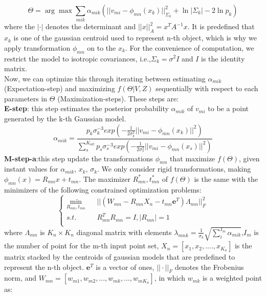 \begin{equation}
\label{equ:obj3}
\Theta=\arg\max\sum_{mik}\alpha_{mik}(||v_{mi}-\phi_{mn}(x_k)||_{\Sigma_k}^2 + \ln |\Sigma_k| - 2\ln p_k)
\end{equation}
where the $|\cdot|$ denotes the determinant and $||x||_A^2=x^TA^{-1}x$. It is predefined that $x_k$ is one of the gaussian centroid used to represent n-th object, which is why we apply transformation $\phi_{mn}$ on to the $x_k$. For the convenience of computation, we restrict the model to isotropic covariances, i.e.,$\Sigma_k=\sigma^2I$ and $I$ is the identity matrix.\\
Now, we can optimize this through iterating between estimating $\alpha_{mik}$ (Expectation-step) and maximizing $f(\Theta|V,Z)$ sequentially with respect to each parameters in $\Theta$ (Maximization-steps).
These steps are:\\
\textbf{E-step}:
this step estimates the posterior probability $\alpha_{mik}$ of $v_{mi}$ to be a point generated by the k-th Gaussian model.\\
\begin{equation}
\label{equ:estep}
\alpha_{mik}=\frac{p_k\sigma_k^{-3}exp(-\frac{1}{2\sigma_k^2}||v_{mi}-\phi_{mn}(x_k)||^2)}{\sum_s^{K_{all}}p_s\sigma_s^{-3}exp(-\frac{1}{2\sigma_s^2}||v_{mi}-\phi_{mn}(x_s)||^2)}
\end{equation}
\textbf{M-step-a}:this step update the transformations $\phi_{mn}$ that maximize $f(\Theta)$, given instant values for $\alpha_{mik}$, $x_k$, $\sigma_k$. We only consider rigid transformations, making  $\phi_{mn}(x)=R_{mn}x+t_{mn}$. The maximizer $R_{mn}^*,t_{mn}^*$  of $f(\Theta)$ is the same with the minimizers of the following constrained optimization problems:\\
\begin{equation}
\left\{
\begin{array}{rcl}
\min_{R_{mn},t_{mn}}&      &||(W_{mn}-R_{mn}X_n-t_{mn}\mathbf{e}^T)\Lambda_{mn}||_F^2\\
s.t.&      &R_{mn}^TR_{mn}=I, |R_{mn}|=1\\
\end{array} \right.
\end{equation}
where $\Lambda_{mn}$ is $K_n \times K_n$ diagonal matrix with elements $\lambda_{mnk}=\frac{1}{\sigma_k}\sqrt{\sum_i^{I_{m}}\alpha_{mik}}$,$I_m$ is the number of point for the m-th input point set, $X_n = [x_1,x_2,....,x_{K_n}]$ is the matrix stacked by the centroids of gaussian models that are predefined to represent the n-th object. $\mathbf{e}^T$ is a vector of ones, $||\cdot||_F$ denotes the Frobenius norm, and $W_{mn}=[w_{m1},w_{m2},...,w_{mk},...,w_{mK_n}]$, in which $w_{mk}$ is a weighted point as:\\
